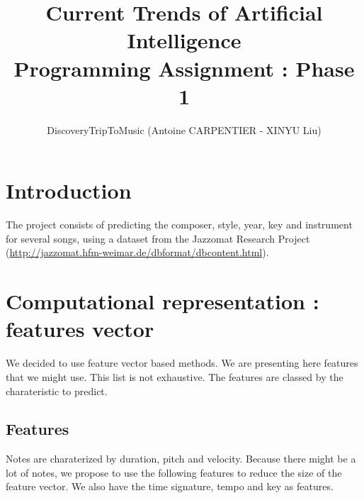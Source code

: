 \documentclass[a4paper,12pt]{article}
\author{DiscoveryTripToMusic (Antoine CARPENTIER - XINYU Liu)}
\title{Current Trends of Artificial Intelligence\\ \small Programming Assignment : Phase 1}
\begin{document}
\maketitle

\section{Introduction}

The project consists of predicting the composer, style, year, key and instrument for several songs, using a dataset from the Jazzomat Research Project (\url{http://jazzomat.hfm-weimar.de/dbformat/dbcontent.html}).

\section{Computational representation : features vector}

We decided to use feature vector based methods. We are presenting here features that we might use. This list is not exhaustive. The features are classed by the charateristic to predict.

\subsection{Features}
    Notes are charaterized by duration, pitch and velocity. Because there might be a lot of notes, we propose to use the following features to reduce the size of the feature vector. We also have the time signature, tempo and key as features.
\end{document}
